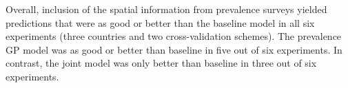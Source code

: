 \documentclass{statsoc}
\begin{document}

Overall, inclusion of the spatial information from prevalence surveys yielded predictions that were as good or better than the baseline model in all six experiments (three countries and two cross-validation schemes).
The prevalence GP model was as good or better than baseline in five out of six experiments.
In contrast, the joint model was only better than baseline in three out of six experiments.










\begin{table}
\caption{\label{table3}Summary of coverage of 80\% credible intervals. The proportion of held out data points that fall within their 80\% credible intervals. 
Cases where this is below 0.7 are highlighted in bold.}
\centering
{}
\end{table}
\end{document}
